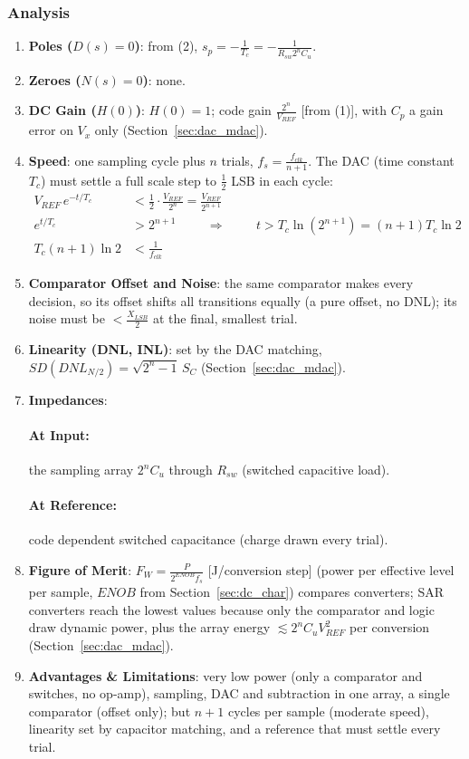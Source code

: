 \subsubsection{Analysis}
\begin{enumerate}
  \item \textbf{Poles (\(D(s) = 0\))}: from (2), \(s_p = -\frac{1}{T_c} = -\frac{1}{R_{sw} 2^n C_u}\).
  \item \textbf{Zeroes (\(N(s) = 0\))}: none.
  \item \textbf{DC Gain (\(H(0)\))}: \(H(0) = 1\); code gain \(\frac{2^n}{V_{REF}}\) [from (1)], with \(C_p\) a gain error
    on \(V_x\) only (Section~\ref{sec:dac_mdac}).
  \item \textbf{Speed}: one sampling cycle plus \(n\) trials,
    \(f_s = \frac{f_{clk}}{n + 1}\). The DAC (time constant \(T_c\)) must settle a full
    scale step to \(\frac{1}{2}\) LSB in each cycle:
    \begin{align*}
      V_{REF}\, e^{-t/T_c} &< \frac{1}{2}\cdot\frac{V_{REF}}{2^n} = \frac{V_{REF}}{2^{n+1}} \\
      e^{t/T_c} &> 2^{n+1} \hspace{1cm} \Rightarrow \hspace{1cm} t > T_c \ln(2^{n+1}) = (n + 1) T_c \ln 2 \\
      T_c (n + 1) \ln 2 &< \frac{1}{f_{clk}}
    \end{align*}
  \item \textbf{Comparator Offset and Noise}: the same comparator makes every decision, so its
    offset shifts all transitions equally (a pure offset, no DNL); its noise
    must be \(< \frac{X_{LSB}}{2}\) at the final, smallest trial.
  \item \textbf{Linearity (DNL, INL)}: set by the DAC matching, \(SD(DNL_{N/2}) = \sqrt{2^n - 1}\,S_C\) (Section~\ref{sec:dac_mdac}).
  \item \textbf{Impedances}:
    \paragraph{At Input:} the sampling array \(2^n C_u\) through \(R_{sw}\) (switched capacitive load).
    \paragraph{At Reference:} code dependent switched capacitance (charge drawn every trial).
  \item \textbf{Figure of Merit}: \(F_{W} = \frac{P}{2^{ENOB} f_s}\) [J/conversion step] (power per effective level per
    sample, \(ENOB\) from Section~\ref{sec:dc_char}) compares converters; SAR converters reach the lowest values because only the comparator and logic
    draw dynamic power, plus the array energy \(\lesssim 2^n C_u V_{REF}^2\) per conversion (Section~\ref{sec:dac_mdac}).
  \item \textbf{Advantages \& Limitations}: very low power (only a comparator and switches, no
    op-amp), sampling, DAC and subtraction in one array, a single comparator (offset only);
    but \(n + 1\) cycles per sample (moderate speed), linearity set by capacitor matching, and a
    reference that must settle every trial.
\end{enumerate}

